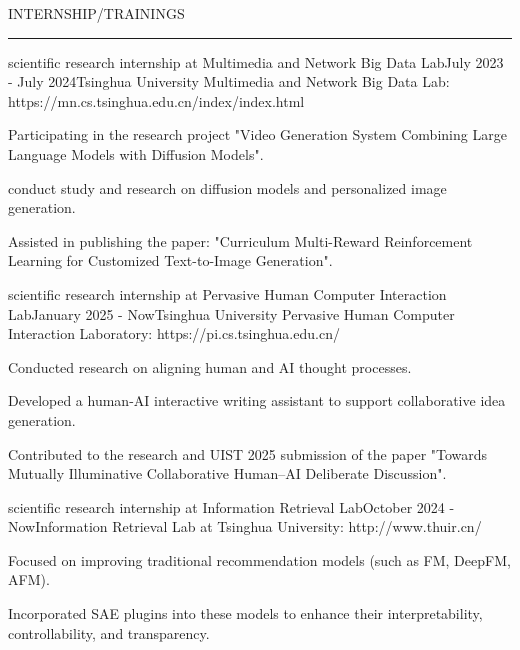 \documentclass{resume} %
\renewenvironment{rSection}[1]{
\sectionskip
\textcolor{TsinghuaPurple}{\MakeUppercase{#1}}
\sectionlineskip
\hrule
\begin{list}{}{
\setlength{\leftmargin}{0em}
}
\item[]
}{
\end{list}
}
\begin{document}

\begin{rSection}{INTERNSHIP/TRAININGS}

\begin{rSubsection}{scientific research internship at Multimedia and Network Big Data Lab}{July 2023 - July 2024}{Tsinghua University Multimedia and Network Big Data Lab: https://mn.cs.tsinghua.edu.cn/index/index.html}{}              
\item Participating in the research project "Video Generation System Combining Large Language Models with Diffusion Models".  
\item conduct study and research on diffusion models and personalized image generation.
\item Assisted in publishing the paper: "Curriculum Multi-Reward Reinforcement Learning for Customized Text-to-Image Generation".
\end{rSubsection}  

\begin{rSubsection}{scientific research internship at Pervasive Human Computer Interaction Lab}{January 2025 - Now}{Tsinghua University Pervasive Human Computer Interaction Laboratory: https://pi.cs.tsinghua.edu.cn/}{}              
\item Conducted research on aligning human and AI thought processes.
\item Developed a human-AI interactive writing assistant to support collaborative idea generation.
\item Contributed to the research and UIST 2025 submission of the paper "Towards Mutually Illuminative Collaborative Human–AI Deliberate Discussion".
\end{rSubsection}  

\begin{rSubsection}{scientific research internship at Information Retrieval Lab}{October 2024 - Now}{Information Retrieval Lab at Tsinghua University: http://www.thuir.cn/}{}              
\item Focused on improving traditional recommendation models (such as FM, DeepFM, AFM).
\item Incorporated SAE plugins into these models to enhance their interpretability, controllability, and transparency.
\end{rSubsection}  

\end{rSection}
\end{document}

